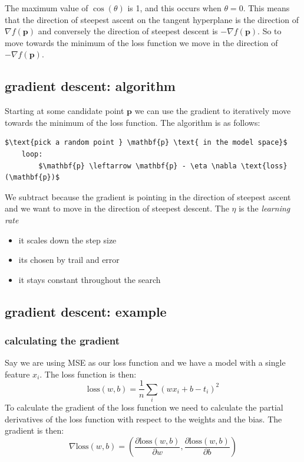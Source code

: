 \documentclass[12pt]{article}
\theoremstyle{definition}
\begin{document}
The maximum value of $\cos(\theta)$ is 1, and this occurs when $\theta = 0$. This means that the direction of steepest ascent on the tangent hyperplane is the direction of $\nabla f(\mathbf{p})$ and conversely the direction of steepest descent is $-\nabla f(\mathbf{p})$. So to move towards the minimum of the loss function we move in the direction of $-\nabla f(\mathbf{p})$.

\subsection{gradient descent: algorithm}

Starting at some candidate point $\mathbf{p}$ we can use the gradient to iteratively move towards the minimum of the loss function. The algorithm is as follows:

\begin{lstlisting}[caption=gradient descent algorithm]
    $\text{pick a random point } \mathbf{p} \text{ in the model space}$
    loop:
        $\mathbf{p} \leftarrow \mathbf{p} - \eta \nabla \text{loss}(\mathbf{p})$
\end{lstlisting}

We subtract because the gradient is pointing in the direction of steepest ascent and we want to move in the direction of steepest descent. The $\eta$ is the \textit{learning rate} 
\begin{itemize}[leftmargin=*, noitemsep]
    \item it scales down the step size
    \item its chosen by trail and error 
    \item it stays constant throughout the search 
\end{itemize}

\subsection{gradient descent: example}
\subsubsection*{calculating the gradient}
Say we are using MSE as our loss function and we have a model with a single feature $x_i$. The loss function is then:
\begin{equation}
    \text{loss}(w, b) = \frac{1}{n}\sum_{i}{(wx_i + b - t_i)}^2
\end{equation}
To calculate the gradient of the loss function we need to calculate the partial derivatives of the loss function with respect to the weights and the bias. The gradient is then:
\begin{equation}
    \nabla \text{loss}(w, b) = \left(\frac{\partial \text{loss}(w, b)}{\partial w}, \frac{\partial \text{loss}(w, b)}{\partial b}\right)
\end{equation}
\end{document}

